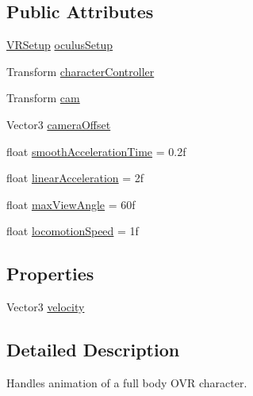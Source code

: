\subsection*{Public Attributes}
\begin{DoxyCompactItemize}
\item 
\mbox{\hyperlink{class_root_motion_1_1_demos_1_1_v_r_setup}{V\+R\+Setup}} \mbox{\hyperlink{class_root_motion_1_1_demos_1_1_v_r_animator_controller_a8a1af118805c816c9fb92419a209f6f3}{oculus\+Setup}}
\item 
Transform \mbox{\hyperlink{class_root_motion_1_1_demos_1_1_v_r_animator_controller_af33a445600f484796940fee0442619b5}{character\+Controller}}
\item 
Transform \mbox{\hyperlink{class_root_motion_1_1_demos_1_1_v_r_animator_controller_ae531f867289a1ea40a798b84d6f69cb2}{cam}}
\item 
Vector3 \mbox{\hyperlink{class_root_motion_1_1_demos_1_1_v_r_animator_controller_ac96f813b6db058cedf8c1772d726e030}{camera\+Offset}}
\item 
float \mbox{\hyperlink{class_root_motion_1_1_demos_1_1_v_r_animator_controller_a626f56536d793b502246ddc1fa541f47}{smooth\+Acceleration\+Time}} = 0.\+2f
\item 
float \mbox{\hyperlink{class_root_motion_1_1_demos_1_1_v_r_animator_controller_acae4deaabddf849714434e425cf37408}{linear\+Acceleration}} = 2f
\item 
float \mbox{\hyperlink{class_root_motion_1_1_demos_1_1_v_r_animator_controller_a897d2132fddcaf0d6325bd1aca47b24b}{max\+View\+Angle}} = 60f
\item 
float \mbox{\hyperlink{class_root_motion_1_1_demos_1_1_v_r_animator_controller_a04039932e77a786485e7e32abc28e206}{locomotion\+Speed}} = 1f
\end{DoxyCompactItemize}
\subsection*{Properties}
\begin{DoxyCompactItemize}
\item 
Vector3 \mbox{\hyperlink{class_root_motion_1_1_demos_1_1_v_r_animator_controller_af2d8067d0e9946fd2f0f305f90b3e11f}{velocity}}
\end{DoxyCompactItemize}


\subsection{Detailed Description}
Handles animation of a full body O\+VR character. 



